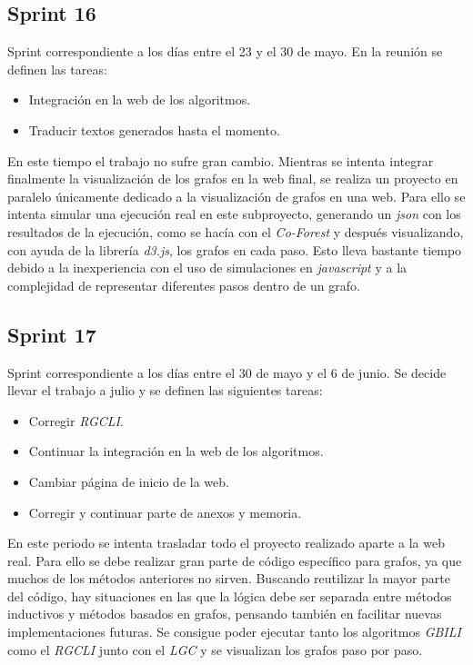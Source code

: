 \subsection{Sprint 16}
Sprint correspondiente a los días entre el 23 y el 30 de mayo. En la reunión se definen las tareas:
\begin{itemize}
	\item Integración en la web de los algoritmos.
	\item Traducir textos generados hasta el momento.
\end{itemize}

En este tiempo el trabajo no sufre gran cambio. Mientras se intenta integrar finalmente la visualización de los grafos en la web final, se realiza un proyecto en paralelo únicamente dedicado a la visualización de grafos en una web. Para ello se intenta simular una ejecución real en este subproyecto, generando un \textit{json} con los resultados de la ejecución, como se hacía con el \textit{Co-Forest} y después visualizando, con ayuda de la librería \textit{d3.js}, los grafos en cada paso. Esto lleva bastante tiempo debido a la inexperiencia con el uso de simulaciones en \textit{javascript} y a la complejidad de representar diferentes pasos dentro de un grafo.

\subsection{Sprint 17}
Sprint correspondiente a los días entre el 30 de mayo y el 6 de junio. Se decide llevar el trabajo a julio y se definen las siguientes tareas:
\begin{itemize}
	\item Corregir \textit{RGCLI}.
	\item Continuar la integración en la web de los algoritmos.
	\item Cambiar página de inicio de la web.
	\item Corregir y continuar parte de anexos y memoria.
\end{itemize}

En este periodo se intenta trasladar todo el proyecto realizado aparte a la web real. Para ello se debe realizar gran parte de código específico para grafos, ya que muchos de los métodos anteriores no sirven. Buscando reutilizar la mayor parte del código, hay situaciones en las que la lógica debe ser separada entre métodos inductivos y métodos basados en grafos, pensando también en facilitar nuevas implementaciones futuras.
Se consigue poder ejecutar tanto los algoritmos \textit{GBILI} como el \textit{RGCLI} junto con el \textit{LGC} y se visualizan los grafos paso por paso.


